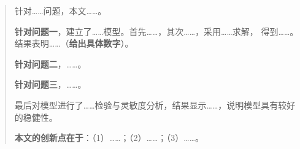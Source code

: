%

\begin{abstract}

针对……问题，本文……。

\textbf{针对问题一}，建立了……模型。首先……，其次……，采用……求解，
得到……。结果表明……（\textbf{给出具体数字}）。

\textbf{针对问题二}，……。

\textbf{针对问题三}，……。

最后对模型进行了……检验与灵敏度分析，结果显示……，说明模型具有较好的稳健性。

\textbf{本文的创新点在于}：（1）……；（2）……；（3）……。


\end{abstract}
